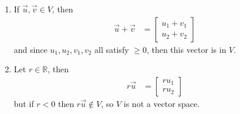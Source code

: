 \begin{enumerate}
\item If $\vec{u}, \vec{v} \in V$, then 
%
\begin{align*}
\vec{u} + \vec{v} & = \begin{bmatrix}
u_1 + v_1 \\
u_2 + v_2 
\end{bmatrix}
\end{align*}
and since $u_1, u_2, v_1, v_2$ all satisfy $\geq 0$, then this vector is in $V$. 

\setcounter{enumi}{5}

\item Let $r \in \mathbb{R}$, then 
%
\begin{align*}
r \vec{u} & = \begin{bmatrix}
r u_1 \\ r u_2
\end{bmatrix}
\end{align*}
but if $r<0$ then $r \vec{u} \not \in V$, so $V$ is not a vector space.  
\end{enumerate}


